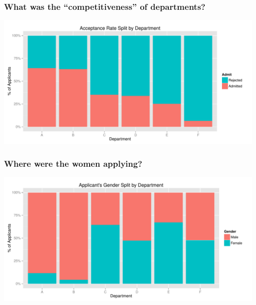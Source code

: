 \documentclass[slides]{beamer}\usepackage[]{graphicx}\usepackage[]{color}
\begin{document}
\begin{frame}
\frametitle{What was the ``competitiveness'' of departments?}

\begin{center}
\includegraphics[width=\textwidth]{dept-accpt.pdf}
\end{center}

\end{frame}



\begin{frame}
\frametitle{Where were the women applying?}

\begin{center}
\includegraphics[width=\textwidth]{dept-gender.pdf}
\end{center}

\end{frame}
\end{document}
